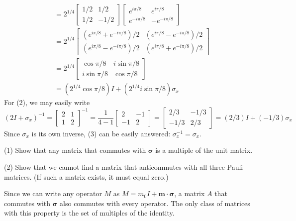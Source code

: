 \documentclass[../principles-of-quantum-mechanics.tex]{subfiles}
\begin{document}
\begin{questions}
\begin{solution}
\begin{align*}
				&= 2^{1/4}\begin{bmatrix}1/2 & 1/2 \\ 1/2 & -1/2\end{bmatrix}\begin{bmatrix}e^{i\pi/8}  & e^{i\pi/8} \\ e^{-i\pi/8} & -e^{-i\pi/8}\end{bmatrix} \\
				&= 2^{1/4}\begin{bmatrix}(e^{i\pi/8} + e^{-i\pi/8})/2 & (e^{i\pi/8} - e^{-i\pi/8})/2 \\ (e^{i\pi/8} - e^{-i\pi/8})/2 & (e^{i\pi/8} + e^{-i\pi/8})/2\end{bmatrix} \\
				&= 2^{1/4}\begin{bmatrix}\cos\pi/8 & i\sin\pi/8 \\ i\sin\pi/8 & \cos\pi/8\end{bmatrix} \\
				&= (2^{1/4}\cos\pi/8)I + (2^{1/4}i\sin\pi/8)\sigma_x
			\end{align*}
			For (2), we may easily write
			$$(2I + \sigma_x)^{-1} = \begin{bmatrix}2 & 1 \\ 1 & 2\end{bmatrix}^{-1} = \frac{1}{4-1}\begin{bmatrix}2 & -1 \\ -1 & 2\end{bmatrix} = \begin{bmatrix}2/3 & -1/3 \\ -1/3 & 2/3\end{bmatrix} = (2/3)I + (-1/3)\sigma_x$$
			Since $\sigma_x$ is its own inverse, (3) can be easily answered: $\sigma_x^{-1} = \sigma_x$.
		\end{solution}
		
		\question (1) Show that any matrix that commutes with $\boldsymbol{\sigma}$ is a multiple of the unit matrix.
		
		(2) Show that we cannot find a matrix that anticommutes with all three Pauli matrices. (If such a matrix exists, it must equal zero.)
		\begin{solution}
			Since we can write any operator $M$ as $M = m_0I + \mathbf{m}\cdot\boldsymbol{\sigma}$, a matrix $A$ that commutes with $\boldsymbol{\sigma}$ also commutes with every operator. The only class of matrices with this property is the set of multiples of the identity.
			

\end{solution}
\end{questions}
\end{document}
